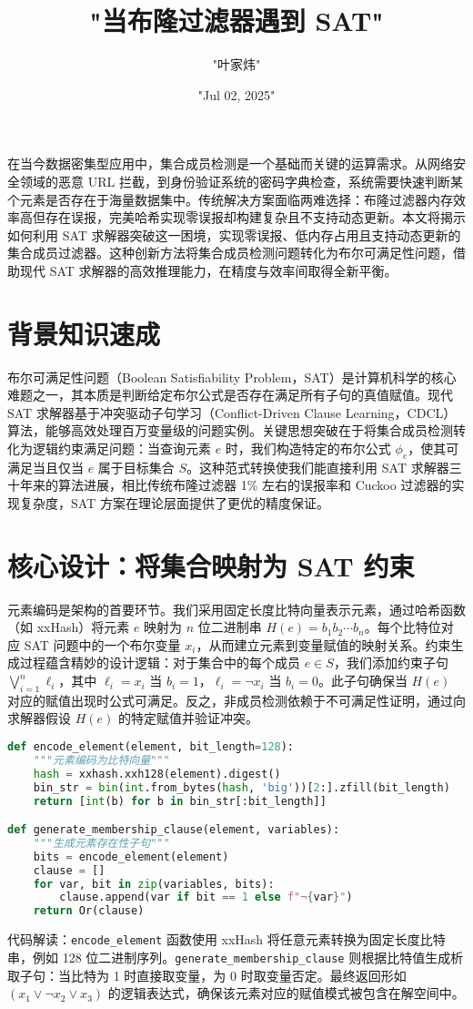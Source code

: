 \title{"当布隆过滤器遇到 SAT"}
\author{"叶家炜"}
\date{"Jul 02, 2025"}
\maketitle
在当今数据密集型应用中，集合成员检测是一个基础而关键的运算需求。从网络安全领域的恶意 URL 拦截，到身份验证系统的密码字典检查，系统需要快速判断某个元素是否存在于海量数据集中。传统解决方案面临两难选择：布隆过滤器内存效率高但存在误报，完美哈希实现零误报却构建复杂且不支持动态更新。本文将揭示如何利用 SAT 求解器突破这一困境，实现零误报、低内存占用且支持动态更新的集合成员过滤器。这种创新方法将集合成员检测问题转化为布尔可满足性问题，借助现代 SAT 求解器的高效推理能力，在精度与效率间取得全新平衡。\par
\chapter{背景知识速成}
布尔可满足性问题（Boolean Satisfiability Problem，SAT）是计算机科学的核心难题之一，其本质是判断给定布尔公式是否存在满足所有子句的真值赋值。现代 SAT 求解器基于冲突驱动子句学习（Conflict-Driven Clause Learning，CDCL）算法，能够高效处理百万变量级的问题实例。关键思想突破在于将集合成员检测转化为逻辑约束满足问题：当查询元素 $e$ 时，我们构造特定的布尔公式 $\phi_e$，使其可满足当且仅当 $e$ 属于目标集合 $S$。这种范式转换使我们能直接利用 SAT 求解器三十年来的算法进展，相比传统布隆过滤器 1\%{} 左右的误报率和 Cuckoo 过滤器的实现复杂度，SAT 方案在理论层面提供了更优的精度保证。\par
\chapter{核心设计：将集合映射为 SAT 约束}
元素编码是架构的首要环节。我们采用固定长度比特向量表示元素，通过哈希函数（如 xxHash）将元素 $e$ 映射为 $n$ 位二进制串 $H(e) = b_1b_2\cdots b_n$。每个比特位对应 SAT 问题中的一个布尔变量 $x_i$，从而建立元素到变量赋值的映射关系。约束生成过程蕴含精妙的设计逻辑：对于集合中的每个成员 $e \in S$，我们添加约束子句 $\bigvee_{i=1}^n \ell_i$，其中 $\ell_i = x_i$ 当 $b_i=1$，$\ell_i = \neg x_i$ 当 $b_i=0$。此子句确保当 $H(e)$ 对应的赋值出现时公式可满足。反之，非成员检测依赖于不可满足性证明，通过向求解器假设 $H(e)$ 的特定赋值并验证冲突。\par
\begin{lstlisting}[language=python]
def encode_element(element, bit_length=128):
    """元素编码为比特向量"""
    hash = xxhash.xxh128(element).digest()
    bin_str = bin(int.from_bytes(hash, 'big'))[2:].zfill(bit_length)
    return [int(b) for b in bin_str[:bit_length]]

def generate_membership_clause(element, variables):
    """生成元素存在性子句"""
    bits = encode_element(element)
    clause = []
    for var, bit in zip(variables, bits):
        clause.append(var if bit == 1 else f"¬{var}")
    return Or(clause)
\end{lstlisting}
代码解读：\texttt{encode\_{}element} 函数使用 xxHash 将任意元素转换为固定长度比特串，例如 128 位二进制序列。\texttt{generate\_{}membership\_{}clause} 则根据比特值生成析取子句：当比特为 1 时直接取变量，为 0 时取变量否定。最终返回形如 $(x_1 \lor \neg x_2 \lor x_3)$ 的逻辑表达式，确保该元素对应的赋值模式被包含在解空间中。\par
